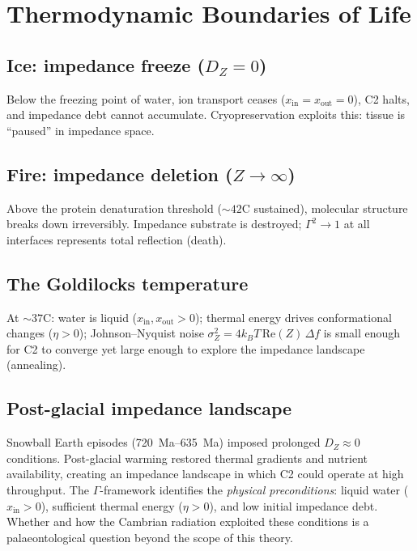 \documentclass[aps,pre,twocolumn,superscriptaddress,floatfix]{revtex4-2}
\begin{document}
\section{Thermodynamic Boundaries of Life}
\label{sec:boundaries}

\subsection{Ice: impedance freeze ($D_Z = 0$)}
Below the freezing point of water, ion transport
ceases ($x_{\text{in}} = x_{\text{out}} = 0$),
C2 halts, and impedance debt cannot accumulate.
Cryopreservation exploits this: tissue is ``paused''
in impedance space.

\subsection{Fire: impedance deletion ($Z \to \infty$)}
Above the protein denaturation threshold ($\sim 42$\textdegree C
sustained), molecular structure breaks down irreversibly.
Impedance substrate is destroyed; $\Gamma^2 \to 1$ at all
interfaces represents total reflection (death).

\subsection{The Goldilocks temperature}
At $\sim 37$\textdegree C: water is liquid
($x_{\text{in}}, x_{\text{out}} > 0$);
thermal energy drives conformational changes
($\eta > 0$); Johnson--Nyquist noise
$\sigma_Z^2 = 4k_BT\,\text{Re}(Z)\,\Delta f$
is small enough for C2 to converge yet large
enough to explore the impedance landscape (annealing).

\subsection{Post-glacial impedance landscape}

Snowball Earth episodes
(\SIrange{720}{635}{Ma}) imposed prolonged $D_Z \approx 0$
conditions.  Post-glacial warming restored thermal
gradients and nutrient availability, creating an
impedance landscape in which C2 could operate at high
throughput.
The $\Gamma$-framework identifies the \emph{physical
preconditions}: liquid water ($x_{\text{in}} > 0$),
sufficient thermal energy ($\eta > 0$), and
low initial impedance debt.
Whether and how the Cambrian radiation exploited
these conditions is a palaeontological question
beyond the scope of this theory.
\end{document}
